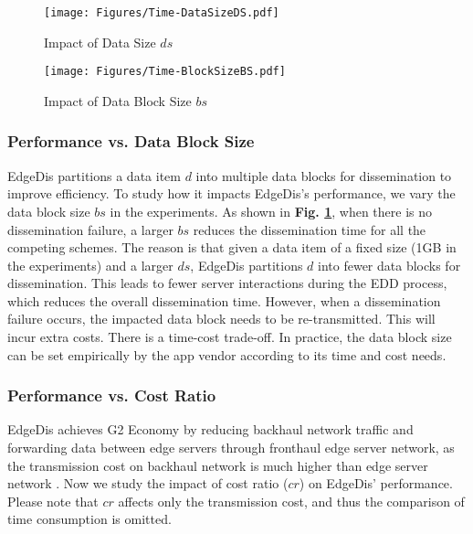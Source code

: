 \documentclass[10pt,journal,compsoc]{IEEEtran}
\begin{document}
%
\begin{figure}[tbp]
\begin{minipage}[c]{0.49\linewidth}
    \centering
    \texttt{[image: Figures/Time-DataSizeDS.pdf]}
    \caption{ Impact of Data Size $ds$} 
    \label{Fig:Efficiency_DataSize} 
\end{minipage}
\begin{minipage}[c]{0.49\linewidth}
    \centering 
    \texttt{[image: Figures/Time-BlockSizeBS.pdf]} 
    \caption{Impact of Data Block Size $bs$ } 
    \label{Fig:Efficiency_DataBlockSize} 
\end{minipage}
\end{figure}


\subsubsection{Performance vs. Data Block Size} 

EdgeDis partitions a data item $d$ into multiple data blocks for dissemination to improve efficiency. To study how it impacts EdgeDis's performance, we vary the data block size $bs$ in the experiments. As shown in \textbf{Fig. \ref{Fig:Efficiency_DataBlockSize}}, when there is no dissemination failure, a larger $bs$ reduces the dissemination time for all the competing schemes. The reason is that given a data item of a fixed size (1GB in the experiments) and a larger $ds$, EdgeDis partitions $d$ into fewer data blocks for dissemination. This leads to fewer server interactions during the EDD process, which reduces the overall dissemination time. However, when a dissemination failure occurs, the impacted data block needs to be re-transmitted. This will incur extra costs. There is a time-cost trade-off. In practice, the data block size can be set empirically by the app vendor according to its time and cost needs.


\subsubsection{Performance vs. Cost Ratio}

EdgeDis achieves G2 Economy by reducing backhaul network traffic and forwarding data between edge servers through fronthaul edge server network, as the transmission cost on backhaul network is much higher than edge server network \cite{xia2021cost,li2020read}. Now we study the impact of cost ratio ($cr$) on EdgeDis' performance. Please note that $cr$ affects only the transmission cost, and thus the comparison of time consumption is omitted.
\end{document}
